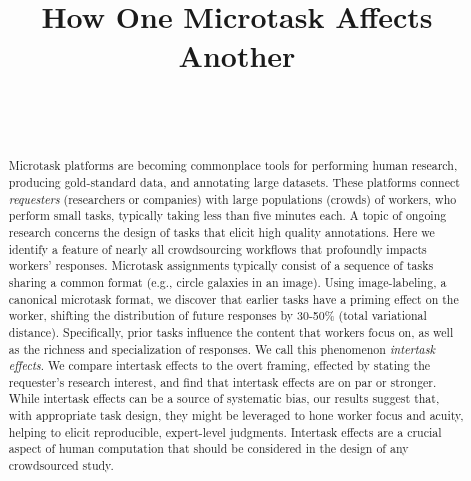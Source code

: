 \documentclass{sigchi}
\begin{document}
\title{How One Microtask Affects Another}

\author{%
  \\
  \\
}

\maketitle

\begin{abstract}
Microtask platforms are becoming commonplace tools for performing human
research, producing gold-standard data, and annotating large datasets.
These platforms connect \textit{requesters}
(researchers or companies) with large populations (crowds) of workers, who 
perform small tasks, typically taking less than five minutes each.
A topic of ongoing research concerns the design of tasks that elicit high
quality annotations.
Here we identify a feature of nearly all crowdsourcing 
workflows that profoundly impacts workers' responses.
Microtask assignments typically consist of a sequence 
of tasks sharing a common format (e.g., circle galaxies in an image). 
Using image-labeling, a canonical microtask format, we 
discover that earlier tasks have a priming effect on the worker, shifting 
the distribution of future responses by 30-50\% 
(total variational distance). 
Specifically, prior tasks influence the content that workers focus on, 
as well as the richness and specialization of responses. 
We call this phenomenon \textit{intertask effects}.
We compare intertask effects to the overt framing, 
effected by stating the requester's research interest, 
and find that intertask effects are on par or stronger.
While intertask effects can be a source of systematic bias, 
our results suggest that, with appropriate task design, 
they might be leveraged to hone worker focus and acuity, 
helping to elicit reproducible, expert-level judgments.
Intertask effects are a crucial aspect of human computation that should be
considered in the design of any crowdsourced study.
\end{abstract}
\end{document}
